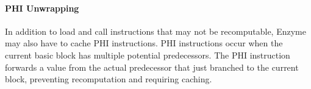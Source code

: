 



\paragraph{\textbf{PHI Unwrapping}}
In addition to load and call instructions that may not be recomputable, Enzyme may also have to cache PHI instructions. PHI instructions occur when the current basic block has multiple potential predecessors. The PHI instruction forwards a value from the actual predecessor that just branched to the current block, preventing recomputation and requiring caching.

